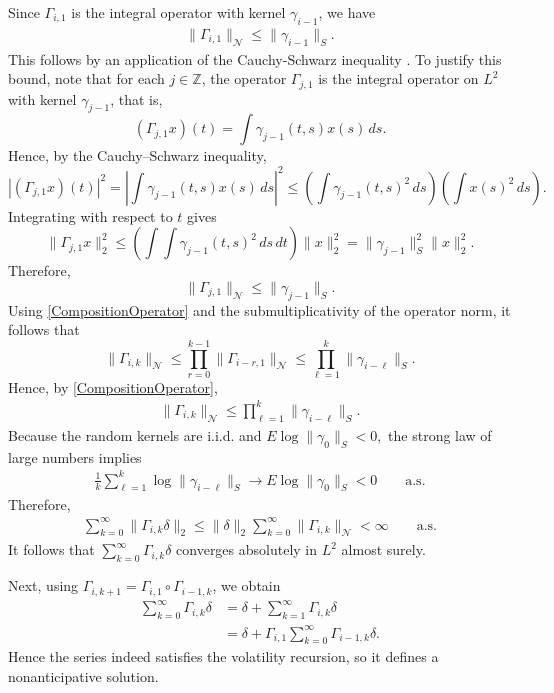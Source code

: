 \documentclass[12pt,a4paper]{article}
\theoremstyle{definition}
\begin{document}
Since \(\Gamma_{i,1}\) is the integral operator with kernel \(\gamma_{i-1}\), we have
\begin{gather}
    \|\Gamma_{i,1}\|_{\mathcal N}\le \|\gamma_{i-1}\|_{S}.
\end{gather}
This follows by an application of the Cauchy-Schwarz inequality \citep{riesz1990functional}. To justify this bound, note that for each \(j\in\mathbb Z\), the operator \(\Gamma_{j,1}\) is the integral operator on \(L^2\) with kernel \(\gamma_{j-1}\), that is,
\[
(\Gamma_{j,1}x)(t)=\int \gamma_{j-1}(t,s)x(s)\,ds.
\]
Hence, by the Cauchy--Schwarz inequality,
\[
|(\Gamma_{j,1}x)(t)|^2
=
\left|\int \gamma_{j-1}(t,s)x(s)\,ds\right|^2
\le
\left(\int \gamma_{j-1}(t,s)^2\,ds\right)\left(\int x(s)^2\,ds\right).
\]
Integrating with respect to \(t\) gives
\[
\|\Gamma_{j,1}x\|_2^2
\le
\left(\int\!\!\int \gamma_{j-1}(t,s)^2\,ds\,dt\right)\|x\|_2^2
=
\|\gamma_{j-1}\|_S^2\|x\|_2^2.
\]
Therefore,
\[
\|\Gamma_{j,1}\|_{\mathcal N}\le \|\gamma_{j-1}\|_S.
\]
Using \cref{CompositionOperator} and the submultiplicativity of the operator norm, it follows that
\[
\|\Gamma_{i,k}\|_{\mathcal N}
\le
\prod_{r=0}^{k-1}\|\Gamma_{i-r,1}\|_{\mathcal N}
\le
\prod_{\ell=1}^k \|\gamma_{i-\ell}\|_S.
\] Hence, by \cref{CompositionOperator},
\begin{gather}
    \|\Gamma_{i,k}\|_{\mathcal N}
    \le
    \prod_{\ell=1}^k \|\gamma_{i-\ell}\|_{S}.
\end{gather}
Because the random kernels are i.i.d. and
\(
E\log \|\gamma_0\|_{S}<0,
\)
the strong law of large numbers implies
\begin{gather}
    \frac1k\sum_{\ell=1}^k \log \|\gamma_{i-\ell}\|_{S}
    \to
    E\log \|\gamma_0\|_{S}
    <0
    \qquad\text{a.s.}
\end{gather}
Therefore,
\begin{gather}
    \sum_{k=0}^\infty \|\Gamma_{i,k}\delta\|_2
    \le
    \|\delta\|_2\sum_{k=0}^\infty \|\Gamma_{i,k}\|_{\mathcal N}
    <
    \infty
    \qquad\text{a.s.}
\end{gather}
It follows that \(\sum_{k=0}^\infty \Gamma_{i,k}\delta\) converges absolutely in \(L^2\) almost surely.

Next, using \(\Gamma_{i,k+1}=\Gamma_{i,1}\circ\Gamma_{i-1,k}\), we obtain
\begin{align*}
    \sum_{k=0}^\infty \Gamma_{i,k}\delta
    &=
    \delta+\sum_{k=1}^\infty \Gamma_{i,k}\delta \\
    &=
    \delta+\Gamma_{i,1}\sum_{k=0}^\infty \Gamma_{i-1,k}\delta.
\end{align*}
Hence the series indeed satisfies the volatility recursion, so it defines a nonanticipative solution.
\end{document}
